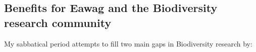\documentclass[authoryear,1p,12pt]{elsarticle}
\begin{document}

\subsection{{\bf Benefits for Eawag and the Biodiversity research community}}
My sabbatical period attempts to fill two main gaps in Biodiversity
research by:
\end{document}
